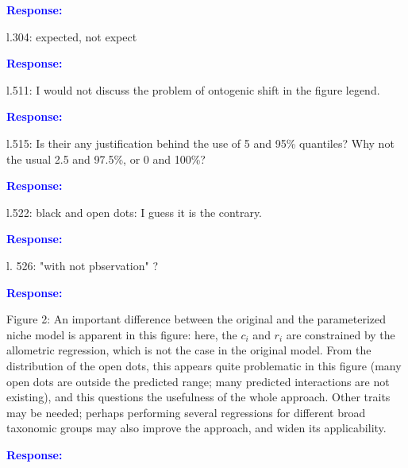 \documentclass [12pt,onecolumn,twoside,openright]{report}
\begin{document}
\begin{onehalfspacing}
\textcolor{blue}{\textbf{Response:}} \textit{\textcolor{blue}{}}

\medskip l.304: expected, not expect

\textcolor{blue}{\textbf{Response:}} \textit{\textcolor{blue}{}}

\medskip l.511: I would not discuss the problem of ontogenic
shift in the figure legend.

\textcolor{blue}{\textbf{Response:}} \textit{\textcolor{blue}{}}

\medskip l.515: Is their any justification behind the use of 5
and 95\% quantiles? Why not the usual 2.5 and 97.5\%, or 0 and 100\%?

\textcolor{blue}{\textbf{Response:}} \textit{\textcolor{blue}{}}

\medskip l.522: black and open dots: I guess it is the
contrary.

\textcolor{blue}{\textbf{Response:}} \textit{\textcolor{blue}{}}

\medskip l. 526: "with not pbservation" ?

\textcolor{blue}{\textbf{Response:}} \textit{\textcolor{blue}{}}

\medskip Figure 2: An important difference between the
original and the parameterized niche model is apparent in this figure: here, the
$c_i$ and $r_i$ are constrained by the allometric regression, which is not the
case in the original model. From the distribution of the open dots, this appears
quite problematic in this figure (many open dots are outside the predicted
range; many predicted interactions are not existing), and this questions the
usefulness of the whole approach. Other traits may be needed; perhaps performing
several regressions for different broad taxonomic groups may also improve the
approach, and widen its applicability.

\textcolor{blue}{\textbf{Response:}} \textit{\textcolor{blue}{}}




\end{onehalfspacing}
\end{document}
